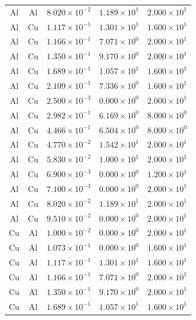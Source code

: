 \documentclass{article}
\begin{document}
\begin{longtable}{ccccc}
Al &  Al & $8.020 \times 10^{-2}$ & $1.189 \times 10^{1}$ & $2.000 \times 10^{1}$ \\
Al &  Cu & $1.117 \times 10^{-1}$ & $1.301 \times 10^{1}$ & $1.600 \times 10^{1}$ \\
Al &  Cu & $1.166 \times 10^{-1}$ & $7.071 \times 10^{0}$ & $2.000 \times 10^{1}$ \\
Al &  Cu & $1.350 \times 10^{-1}$ & $9.170 \times 10^{0}$ & $2.000 \times 10^{1}$ \\
Al &  Cu & $1.689 \times 10^{-1}$ & $1.057 \times 10^{1}$ & $1.600 \times 10^{1}$ \\
Al &  Cu & $2.109 \times 10^{-1}$ & $7.336 \times 10^{0}$ & $1.600 \times 10^{1}$ \\
Al &  Cu & $2.500 \times 10^{-3}$ & $0.000 \times 10^{0}$ & $2.000 \times 10^{1}$ \\
Al &  Cu & $2.982 \times 10^{-1}$ & $6.169 \times 10^{0}$ & $8.000 \times 10^{0}$ \\
Al &  Cu & $4.466 \times 10^{-1}$ & $6.504 \times 10^{0}$ & $8.000 \times 10^{0}$ \\
Al &  Cu & $4.770 \times 10^{-2}$ & $1.542 \times 10^{1}$ & $2.000 \times 10^{1}$ \\
Al &  Cu & $5.830 \times 10^{-2}$ & $1.000 \times 10^{1}$ & $2.000 \times 10^{1}$ \\
Al &  Cu & $6.900 \times 10^{-3}$ & $0.000 \times 10^{0}$ & $1.200 \times 10^{1}$ \\
Al &  Cu & $7.100 \times 10^{-3}$ & $0.000 \times 10^{0}$ & $2.000 \times 10^{1}$ \\
Al &  Cu & $8.020 \times 10^{-2}$ & $1.189 \times 10^{1}$ & $2.000 \times 10^{1}$ \\
Al &  Cu & $9.510 \times 10^{-2}$ & $0.000 \times 10^{0}$ & $2.000 \times 10^{1}$ \\
Cu &  Al & $1.000 \times 10^{-2}$ & $0.000 \times 10^{0}$ & $2.000 \times 10^{1}$ \\
Cu &  Al & $1.073 \times 10^{-1}$ & $0.000 \times 10^{0}$ & $1.600 \times 10^{1}$ \\
Cu &  Al & $1.117 \times 10^{-1}$ & $1.301 \times 10^{1}$ & $1.600 \times 10^{1}$ \\
Cu &  Al & $1.166 \times 10^{-1}$ & $7.071 \times 10^{0}$ & $2.000 \times 10^{1}$ \\
Cu &  Al & $1.350 \times 10^{-1}$ & $9.170 \times 10^{0}$ & $2.000 \times 10^{1}$ \\
Cu &  Al & $1.689 \times 10^{-1}$ & $1.057 \times 10^{1}$ & $1.600 \times 10^{1}$ \\

\end{longtable}
\end{document}

